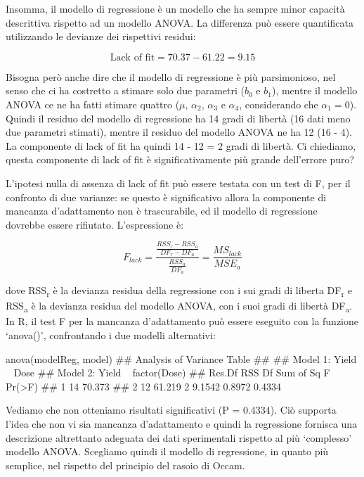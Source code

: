 \documentclass[a4paper,12pt,oneside]{book}
\newenvironment{Shaded}{}{}
\newcommand{\KeywordTok}[1]{#1}
\newcommand{\CommentTok}[1]{#1}
\newcommand{\NormalTok}[1]{#1}
\begin{document}
Insomma, il modello di regressione è un modello che ha sempre minor capacità descrittiva rispetto ad un modello ANOVA. La differenza può essere quantificata utilizzando le devianze dei rispettivi residui:

\[\textrm{Lack of fit} = 70.37 - 61.22 = 9.15\]

Bisogna però anche dire che il modello di regressione è più parsimonioso, nel senso che ci ha costretto a stimare solo due parametri (\(b_0\) e \(b_1\)), mentre il modello ANOVA ce ne ha fatti stimare quattro (\(\mu\), \(\alpha_2\), \(\alpha_3\) e \(\alpha_4\), considerando che \(\alpha_1 = 0\)). Quindi il residuo del modello di regressione ha 14 gradi di libertà (16 dati meno due parametri stimati), mentre il residuo del modello ANOVA ne ha 12 (16 - 4). La componente di lack of fit ha quindi 14 - 12 = 2 gradi di libertà. Ci chiediamo, questa componente di lack of fit è significativamente più grande dell'errore puro?

L'ipotesi nulla di assenza di lack of fit può essere testata con un test di F, per il confronto di due varianze: se questo è significativo allora la componente di mancanza d'adattamento non è trascurabile, ed il modello di regressione dovrebbe essere rifiutato. L'espressione è:

\[ F_{lack} = \frac{\frac{RSS_r - RSS_a}{DF_r-DF_a} } {\frac{RSS_a}{DF_a}} = \frac{MS_{lack}}{MSE_a}\]

dove RSS\textsubscript{r} è la devianza residua della regressione con i sui gradi di liberta DF\textsubscript{r} e RSS\textsubscript{a} è la devianza residua del modello ANOVA, con i suoi gradi di libertà DF\textsubscript{a}. In R, il test F per la mancanza d'adattamento può essere eseguito con la funzione `anova()', confrontando i due modelli alternativi:

\begin{Shaded}
\begin{Highlighting}[]
\KeywordTok{anova}\NormalTok{(modelReg, model)}
\CommentTok{## Analysis of Variance Table}
\CommentTok{## }
\CommentTok{## Model 1: Yield ~ Dose}
\CommentTok{## Model 2: Yield ~ factor(Dose)}
\CommentTok{##   Res.Df    RSS Df Sum of Sq      F Pr(>F)}
\CommentTok{## 1     14 70.373                           }
\CommentTok{## 2     12 61.219  2    9.1542 0.8972 0.4334}
\end{Highlighting}
\end{Shaded}

Vediamo che non otteniamo risultati significativi (P = 0.4334). Ciò supporta l'idea che non vi sia mancanza d'adattamento e quindi la regressione fornisca una descrizione altrettanto adeguata dei dati sperimentali rispetto al più `complesso' modello ANOVA. Scegliamo quindi il modello di regressione, in quanto più semplice, nel rispetto del principio del rasoio di Occam.
\end{document}
